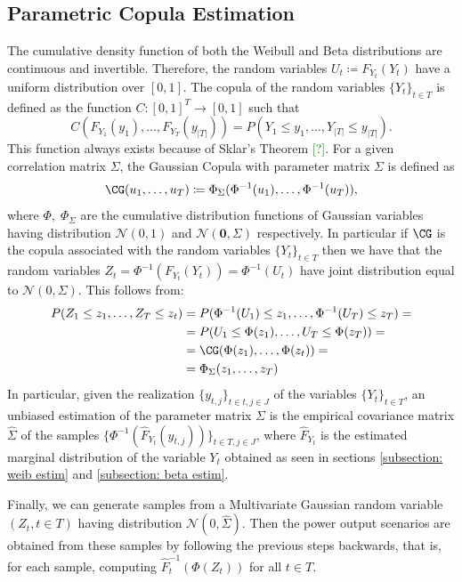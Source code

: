 \subsection{Parametric Copula Estimation}
The cumulative density function of both the Weibull and Beta distributions are continuous and invertible. 
Therefore, the random variables \( U_t \coloneqq F_{Y_t}(Y_t) \) have a uniform distribution over \([0,1]\). 
The copula of the random variables \(\{Y_t\}_{t \in T}\) is defined as the function \(C: [0,1]^T \to [0,1]\) such that 
\begin{equation}
C(F_{Y_1}(y_1), \ldots, F_{Y_T}(y_{|T|})) = P(Y_1 \leq y_1, \ldots, Y_{|T|} \leq y_{|T|}).
\end{equation}
This function always exists because of Sklar's Theorem \textcolor{green}{[?]}. 
For a given correlation matrix \(\Sigma\), the Gaussian Copula with parameter matrix \(\Sigma\) is defined as 
\[\CG(u_1,\ldots,u_{T}) \coloneqq \Phi_{\Sigma}(\Phi^{-1}(u_1),\ldots, \Phi^{-1}(u_T)),\] 
where \(\Phi,\; \Phi_{\Sigma}\) are the cumulative distribution functions of Gaussian variables having distribution \(\mathcal{N}(0,1)\) and \( \mathcal{N}(\mathbf{0},\Sigma)\) respectively. 
In particular if \(\CG\) is the copula associated with the random variables \(\{Y_t\}_{t \in T}\) then we have that the random variables \(Z_t = \Phi^{-1}(F_{Y_t}(Y_t)) = \Phi^{-1}(U_t)\) have joint distribution equal to \(\mathcal{N}(0, \Sigma)\). 
This follows from:
\begin{align*}
P(Z_1 \leq z_1, \ldots, Z_T \leq z_t) &= P(\Phi^{-1}(U_1) \leq z_1, \ldots, \Phi^{-1}(U_T) \leq z_T) = \\
&= P(U_1 \leq \Phi(z_1), \ldots, U_T \leq \Phi(z_T)) = \\
&= \CG(\Phi(z_1), \ldots, \Phi(z_t)) =  \\
&= \Phi_{\Sigma}(z_1, \ldots, z_T)
\end{align*}
In particular, given the realization \(\{y_{t,j}\}_{t \in t, j \in J}\) of the variables \(\{Y_t\}_{t \in T}\), an unbiased estimation of the parameter matrix \(\Sigma\) is the empirical covariance matrix \(\hat \Sigma\) of the samples \(\{\Phi^{-1}(\hat{F}_{Y_t}(y_{t,j}))\}_{t\in T, j \in J}\), where \(\hat{F}_{Y_t}\) is the estimated marginal distribution of the variable \(Y_t\) obtained as seen in sections \ref{subsection: weib estim} and \ref{subsection: beta estim}.

Finally, we can generate samples from a Multivariate Gaussian random variable \((Z_{t}, t \in T)\) having distribution \(\mathcal{N}(0, \hat \Sigma)\).
Then the power output scenarios are obtained from these samples by following the previous steps backwards, that is, for each sample, computing \(\hat F_{t}^{-1}(\Phi(Z_{t}))\) for all \(t\in T\). 













